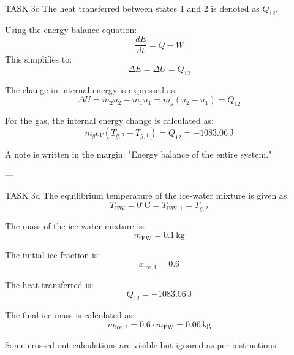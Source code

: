 TASK 3c  
The heat transferred between states 1 and 2 is denoted as \( Q_{12} \).  

Using the energy balance equation:  
\[
\frac{dE}{dt} = \dot{Q} - \dot{W}
\]  
This simplifies to:  
\[
\Delta E = \Delta U = Q_{12}
\]  

The change in internal energy is expressed as:  
\[
\Delta U = m_2 u_2 - m_1 u_1 = m_g (u_2 - u_1) = Q_{12}
\]  

For the gas, the internal energy change is calculated as:  
\[
m_g c_V (T_{g,2} - T_{g,1}) = Q_{12} = -1083.06 \, \text{J}
\]  

A note is written in the margin: "Energy balance of the entire system."

---

TASK 3d  
The equilibrium temperature of the ice-water mixture is given as:  
\[
T_{\text{EW}} = 0^\circ\text{C} = T_{\text{EW},1} = T_{g,2}
\]  

The mass of the ice-water mixture is:  
\[
m_{\text{EW}} = 0.1 \, \text{kg}
\]  

The initial ice fraction is:  
\[
x_{\text{ice},1} = 0.6
\]  

The heat transferred is:  
\[
Q_{12} = -1083.06 \, \text{J}
\]  

The final ice mass is calculated as:  
\[
m_{\text{ice},2} = 0.6 \cdot m_{\text{EW}} = 0.06 \, \text{kg}
\]  

Some crossed-out calculations are visible but ignored as per instructions.